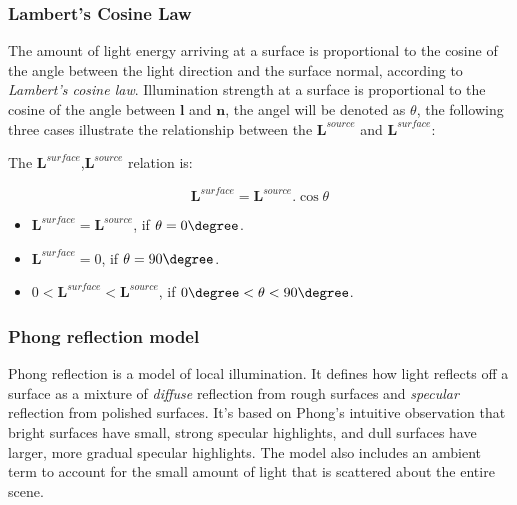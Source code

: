 \documentclass[11pt,a4paper]{article}
\begin{document}
	
	
	
	\subsubsection{Lambert's Cosine Law}
	The amount of light energy arriving at a surface is proportional to the cosine of the angle between the light direction and the surface normal, according to \textit{Lambert's cosine law}. Illumination strength at a surface is proportional to the cosine of the angle between $\pmb{l}$ and $\pmb{n}$, the angel will be denoted as $\theta$, the following three cases illustrate the relationship between the  $\pmb{L}^{source}$ and  $\pmb{L}^{surface}$:
	
	The  $\pmb{L}^{surface}$,$ \pmb{L}^{source}$ relation is:
	
	\begin{equation}
		\pmb{L}^{surface} = \pmb{L}^{source}.\cos \theta 
	\end{equation}
	
	
	\begin{itemize}
		\item $\pmb{L}^{surface} = \pmb{L}^{source}$, if $\theta = 0\degree$.
		\item $\pmb{L}^{surface} = 0$, if $\theta = 90\degree$.
		\item $0 < \pmb{L}^{surface} < \pmb{L}^{source}$, if $0\degree < \theta  < 90\degree$.
	\end{itemize}
	
	\subsubsection{Phong reflection model }
	Phong reflection is a model of local illumination. It defines how light reflects off a surface as a mixture of \textit{diffuse} reflection from rough surfaces and \textit{specular} reflection from polished surfaces. It's based on Phong's intuitive observation that bright surfaces have small, strong specular highlights, and dull surfaces have larger, more gradual specular highlights. The model also includes an ambient term to account for the small amount of light that is scattered about the entire scene.
	\\
	
\end{document}
